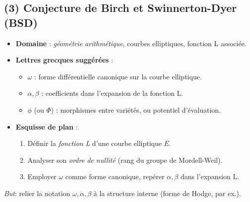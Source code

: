 \documentclass[12pt]{article}
\begin{document}
\subsection{(3) Conjecture de Birch et Swinnerton-Dyer (BSD)}
\begin{itemize}
    \item \textbf{Domaine} : \emph{géométrie arithmétique}, courbes elliptiques, fonction L associée.
    \item \textbf{Lettres grecques suggérées} :
    \begin{itemize}
        \item \(\omega\) : forme différentielle canonique sur la courbe elliptique.
        \item \(\alpha,\beta\) : coefficients dans l’expansion de la fonction L.
        \item \(\phi\) (ou \(\Phi\)) : morphismes entre variétés, ou potentiel d’évaluation.
    \end{itemize}
    \item \textbf{Esquisse de plan} :
    \begin{enumerate}
        \item Définir la \emph{fonction L} d’une courbe elliptique \(E\).
        \item Analyser son \emph{ordre de nullité} (rang du groupe de Mordell-Weil).
        \item Employer \(\omega\) comme forme canonique, repérer $\alpha,\beta$ dans l’expansion L.
    \end{enumerate}
\end{itemize}
\emph{But}: relier la notation $\omega,\alpha,\beta$ à la structure interne (forme de Hodge, par ex.).
\end{document}
